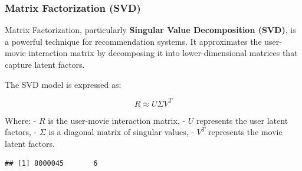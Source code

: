 \documentclass[
]{article}
\newenvironment{Shaded}{}{}
\newcommand{\AttributeTok}[1]{\textcolor[rgb]{0.49,0.56,0.16}{#1}}
\newcommand{\CommentTok}[1]{\textcolor[rgb]{0.38,0.63,0.69}{\textit{#1}}}
\newcommand{\ConstantTok}[1]{\textcolor[rgb]{0.53,0.00,0.00}{#1}}
\newcommand{\DecValTok}[1]{\textcolor[rgb]{0.25,0.63,0.44}{#1}}
\newcommand{\FloatTok}[1]{\textcolor[rgb]{0.25,0.63,0.44}{#1}}
\newcommand{\FunctionTok}[1]{\textcolor[rgb]{0.02,0.16,0.49}{#1}}
\newcommand{\NormalTok}[1]{#1}
\newcommand{\OtherTok}[1]{\textcolor[rgb]{0.00,0.44,0.13}{#1}}
\newcommand{\SpecialCharTok}[1]{\textcolor[rgb]{0.25,0.44,0.63}{#1}}
\begin{document}
\subsubsection{Matrix Factorization
(SVD)}\label{matrix-factorization-svd}

Matrix Factorization, particularly \textbf{Singular Value Decomposition
(SVD)}, is a powerful technique for recommendation systems. It
approximates the user-movie interaction matrix by decomposing it into
lower-dimensional matrices that capture latent factors.

The SVD model is expressed as:

\[
R \approx U \Sigma V^T
\]

Where: - \(R\) is the user-movie interaction matrix, - \(U\) represents
the user latent factors, - \(\Sigma\) is a diagonal matrix of singular
values, - \(V^T\) represents the movie latent factors.

\begin{Shaded}
\end{Shaded}

\begin{verbatim}
## [1] 8000045       6
\end{verbatim}
\end{document}
